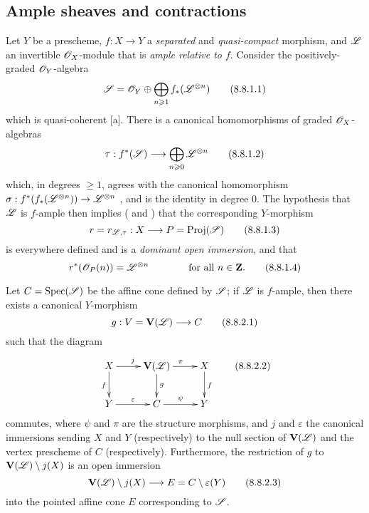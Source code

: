 \subsection{Ample sheaves and contractions}
\label{subsection:II.8.8}

\begin{env}[8.8.1]
\label{II.8.8.1}
Let $Y$ be a prescheme, $f:X\to Y$ a \emph{separated} and \emph{quasi-compact} morphism, and $\mathscr{L}$ an invertible $\mathscr{O}_X$-module that is \emph{ample relative to $f$}.
Consider the positively-graded $\mathscr{O}_Y$-algebra
\[
\label{II.8.8.1.1}
  \mathscr{S} = \mathscr{O}_Y \oplus \bigoplus_{n\geqslant1}f_*(\mathscr{L}^{\otimes n})
\tag{8.8.1.1}
\]
which is quasi-coherent [a].
There is a canonical homomorphisms of graded $\mathscr{O}_X$-algebras
\[
\label{II.8.8.1.2}
  \tau: f^*(\sh{S}) \to \bigoplus_{n\geq0}\sh{L}^{\otimes n}
\tag{8.8.1.2}
\]
which, in degrees $\geq1$, agrees with the canonical homomorphism $\sigma:f^*(f_*(\sh{L}^{\otimes n})) \to \sh{L}^{\otimes n}$ , and is the identity in degree 0.
The hypothesis that $\mathscr{L}$ is $f$-ample then implies ( and ) that the corresponding $Y$-morphism
\[
\label{II.8.8.1.3}
  r = r_{\sh{L},\tau} : X \to P = \Proj(\sh{S})
\tag{8.8.1.3}
\]
is everywhere defined and is a \emph{dominant open immersion}, and that
\[
\label{II.8.8.1.4}
  r^*(\mathscr{O}_P(n)) = \mathscr{L}^{\otimes n}
  \qquad\qquad
  \mbox{for all $n\in\mathbf{Z}$.}
\tag{8.8.1.4}
\]
\end{env}

\begin{proposition}[8.8.2]
\label{II.8.8.2}
Let $C=\operatorname{Spec}(\mathscr{S})$ be the affine cone defined by $\mathscr{S}$;
if $\mathscr{L}$ is $f$-ample, then there exists a canonical $Y$-morphism
\[
\label{II.8.8.2.1}
  g : V = \bb{V}(\sh{L}) \to C
\tag{8.8.2.1}
\]
such that the diagram
\[
\label{II.8.8.2.2}
  \xymatrix{
    X
      \ar[r]^{j}
      \ar[d]_{f}
  & \bb{V}(\sh{L})
      \ar[r]^{\pi}
      \ar[d]^{g}
  & X
      \ar[d]^{f}
  \\Y
      \ar[r]^{\varepsilon}
  & C
      \ar[r]^{\psi}
  & Y
  }
  \tag{8.8.2.2}
\]
commutes, where $\psi$ and $\pi$ are the structure morphisms, and $j$ and $\varepsilon$ the canonical immersions sending $X$ and $Y$ (respectively) to the null section of $\mathbf{V}(\mathscr{L})$ and the vertex prescheme of $C$ (respectively).
Furthermore, the restriction of $g$ to $\mathbf{V}(\mathscr{L})\setminus j(X)$ is an open immersion
\[
\label{II.8.8.2.3}
  \bb{V}(\sh{L})\setminus j(X)\to E=C\setminus\varepsilon(Y)
  \tag{8.8.2.3}
\]
into the pointed affine cone $E$ corresponding to $\mathscr{S}$.
\end{proposition}

